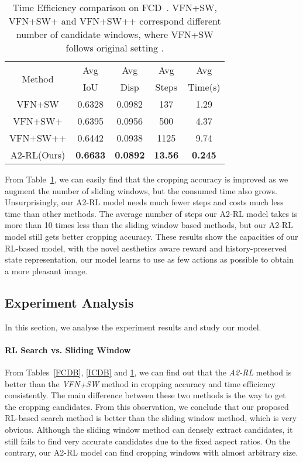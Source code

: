 \documentclass[10pt,twocolumn,letterpaper]{article}
\begin{document}
\begin{table}[t]
\centering
\begin{tabular}{c|c|c|c|c}\hline
\multirow{2}{*}{Method}&\multicolumn{1}{c|}{Avg}&\multicolumn{1}{c|}{Avg}&\multicolumn{1}{c|}{Avg}&\multicolumn{1}{c}{Avg}\\{}&IoU&Disp&Steps&Time(s)\\\hline
VFN+SW&0.6328&0.0982&137&1.29\\
VFN+SW+&0.6395&0.0956&500&4.37\\
VFN+SW++&0.6442&0.0938&1125&9.74\\\hline
A2-RL(Ours)&\textbf{0.6633}&\textbf{0.0892}&\textbf{13.56}&\textbf{0.245}\\\hline
\end{tabular}
\centering
\caption{Time Efficiency comparison on FCD~\cite{chen2017quantitative}. VFN+SW, VFN+SW+ and VFN+SW++ correspond different number of candidate windows, where VFN+SW follows original setting \cite{chen-acmmm-2017}.}
\label{Time}
\end{table}

From Table~\ref{Time}, we can easily find that the cropping accuracy is improved as we augment the number of sliding windows, but the consumed time also grows. Unsurprisingly, our A2-RL model needs much fewer steps and costs much less time than other methods. The average number of steps our A2-RL model takes is more than 10 times less than the sliding window based methods, but our A2-RL model still gets better cropping accuracy. These results show the capacities of our RL-based model, with the novel aesthetics aware reward and history-preserved state representation, our model learns to use as few actions as possible to obtain a more pleasant image.

\subsection{Experiment Analysis}
In this section, we analyse the experiment results and study our model.
\paragraph{RL Search vs. Sliding Window}
From Tables~\ref{FCDB}, \ref{ICDB} and \ref{Time}, we can find out that the \emph{A2-RL} method is better than the \emph{VFN+SW} method in cropping accuracy and time efficiency consistently. The main difference between these two methods is the way to get the cropping candidates. From this observation, we conclude that our proposed RL-based search method is better than the sliding window method, which is very obvious. Although the sliding window method can densely extract candidates, it still fails to find very accurate candidates due to the fixed aspect ratios. On the contrary, our A2-RL model can find cropping windows with almost arbitrary size.
\end{document}
